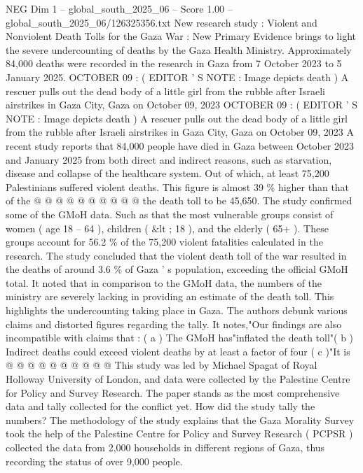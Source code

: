 \begin{textsample}{NEG Dim 1 – global\_south\_2025\_06 – Score 1.00 – global\_south\_2025\_06/126325356.txt}  \label{ex:f1_neg_240}
New research study : Violent and Nonviolent Death Tolls for the Gaza War : New Primary Evidence brings to light the severe undercounting of deaths by the Gaza Health Ministry.
Approximately 84,000 deaths were recorded in the research in Gaza from 7 October 2023 to 5 January 2025.
OCTOBER 09 : ( EDITOR ' S NOTE : Image depicts death ) A rescuer pulls out the dead body of a little girl from the rubble after Israeli airstrikes in Gaza City, Gaza on October 09, 2023 OCTOBER 09 : ( EDITOR ' S NOTE : Image depicts death ) A rescuer pulls out the dead body of a little girl from the rubble after Israeli airstrikes in Gaza City, Gaza on October 09, 2023 A recent study reports that 84,000 people have died in Gaza between October 2023 and January 2025 from both direct and indirect reasons, such as starvation, disease and collapse of the healthcare system.
Out of which, at least 75,200 Palestinians suffered violent deaths.
This figure is almost 39 \% higher than that of the @ @ @ @ @ @ @ @ @ @ the death toll to be 45,650.
The study confirmed some of the GMoH data.
Such as that the most vulnerable groups consist of women ( age 18 -- 64 ), children ( \&lt ; 18 ), and the elderly ( 65+ ).
These groups account for 56.2 \% of the 75,200 violent fatalities calculated in the research.
The study concluded that the violent death toll of the war resulted in the deaths of around 3.6 \% of Gaza ' s population, exceeding the official GMoH total.
It noted that in comparison to the GMoH data, the numbers of the ministry are severely lacking in providing an estimate of the death toll.
This highlights the undercounting taking place in Gaza.
The authors debunk various claims and distorted figures regarding the tally.
It notes,"Our findings are also incompatible with claims that : ( a ) The GMoH has"inflated the death toll"( b ) Indirect deaths could exceed violent deaths by at least a factor of four ( c )"It is @ @ @ @ @ @ @ @ @ @ This study was led by Michael Spagat of Royal Holloway University of London, and data were collected by the Palestine Centre for Policy and Survey Research.
The paper stands as the most comprehensive data and tally collected for the conflict yet.
How did the study tally the numbers?
The methodology of the study explains that the Gaza Morality Survey took the help of the Palestine Centre for Policy and Survey Research ( PCPSR ) collected the data from 2,000 households in different regions of Gaza, thus recording the status of over 9,000 people.

\end{textsample}
